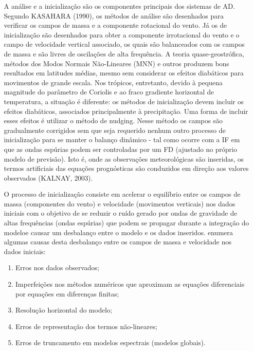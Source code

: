 A análise e a inicialização são os componentes principais dos sistemas de AD. Segundo KASAHARA (1990), os métodos de análise são desenhados para verificar os campos de massa e a componente rotacional do vento. Já os de inicialização são desenhados para obter a componente irrotacional do vento e o campo de velocidade vertical associado, os quais são balanceados com os campos de massa e são livres de oscilações de alta frequência. A teoria quase-geostrófica, métodos dos Modos Normais Não-Lineares (MNN) e outros produzem bons resultados em latitudes médias, mesmo sem considerar os efeitos diabáticos para movimentos de grande escala. Nos trópicos, entretanto, devido à pequena magnitude do parâmetro de Coriolis e ao fraco gradiente horizontal de temperatura, a situação é diferente: os métodos de inicialização devem incluir os efeitos diabáticos, associados principalmente à precipitação. Uma forma de incluir esses efeitos é utilizar o método de nudging. Nesse método os campos são gradualmente corrigidos sem que seja requerido nenhum outro processo de inicialização para se manter o balanço dinâmico - tal como ocorre com a IF em que as ondas espúrias podem ser controladas por um FD (ajustado no próprio modelo de previsão). Isto é, onde as observações meteorológicas são inseridas, os termos artificiais das equações prognósticas são conduzidos em direção aos valores observados (KALNAY, 2003). 

O processo de inicialização consiste em acelerar o equilíbrio entre os campos de massa (componentes do vento) e velocidade (movimentos verticais) nos dados iniciais com o objetivo de se reduzir o ruído gerado por ondas de gravidade de altas frequências (ondas espúrias) que podem se propagar durante a integração do modeloe causar um desbalanço entre o modelo e os dados inseridos. \cite{harter99} enumera algumas causas desta desbalanço entre os campos de massa e velocidade nos dados iniciais:

\begin{enumerate}
\item Erros nos dados observados;
\item Imperfeições nos métodos numéricos que aproximam as equações diferenciais por equações em diferenças finitas;
\item Resolução horizontal do modelo;
\item Erros de representação dos termos não-lineares;
\item Erros de truncamento em modelos espectrais (modelos globais).
\end{enumerate}


